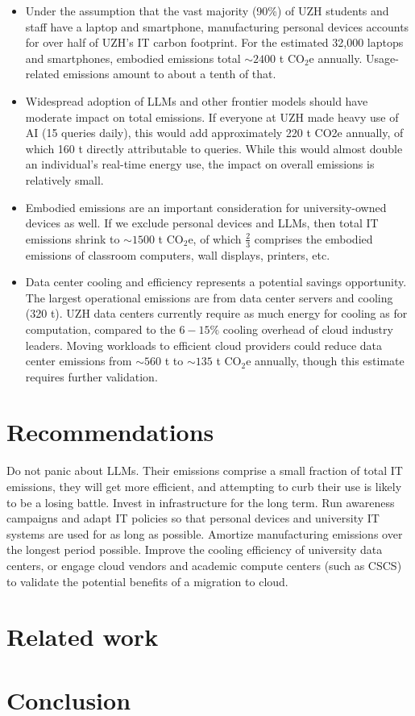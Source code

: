 \documentclass[11pt]{article}
\begin{document}
\begin{itemize}

\item Under the assumption that the vast majority (90\%) of UZH students and staff have a laptop and smartphone, manufacturing personal devices accounts for over half of UZH's IT carbon footprint. For the estimated 32,000 laptops and smartphones, embodied emissions total $\sim 2400$ t CO$_2$e annually. Usage-related emissions amount to about a tenth of that.

\item Widespread adoption of LLMs and other frontier models should have moderate impact on total emissions. If everyone at UZH made heavy use of AI (15 queries daily), this would add approximately 220 t CO2e annually, of which 160 t directly attributable to queries. While this would almost double an individual's real-time energy use, the impact on overall emissions is relatively small.

\item Embodied emissions are an important consideration for university-owned devices as well. If we exclude personal devices and LLMs, then total IT emissions shrink to $\sim 1500$ t CO$_2$e, of which $\frac{2}{3}$ comprises the embodied emissions of classroom computers, wall displays, printers, etc.

\item Data center cooling and efficiency represents a potential savings opportunity. The largest operational emissions are from data center servers and cooling (320 t). UZH data centers currently require as much energy for cooling as for computation, compared to the $6-15\%$ cooling overhead of cloud industry leaders. Moving workloads to efficient cloud providers could reduce data center emissions from $\sim 560$ t to $\sim 135$ t CO$_2$e annually, though this estimate requires further validation.

\end{itemize}

\section{Recommendations}
\label{sec:recommendations}

Do not panic about LLMs. Their emissions comprise a small fraction of total IT emissions, they will get more efficient, and attempting to curb their use is likely to be a losing battle.
Invest in infrastructure for the long term. Run awareness campaigns and adapt IT policies so that personal devices and university IT systems are used for as long as possible. Amortize manufacturing emissions over the longest period possible.
Improve the cooling efficiency of university data centers, or engage cloud vendors and academic compute centers (such as CSCS) to validate the potential benefits of a migration to cloud.



\section{Related work}
\label{sec:related:work}



\section{Conclusion}

\printbibliography
\end{document}
